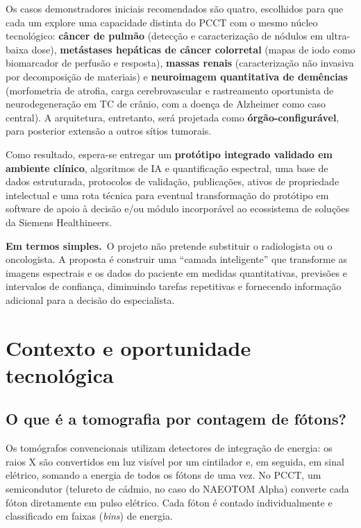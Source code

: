 \documentclass[11pt,a4paper]{article}
\newcommand{\simples}{\textcolor{titleblue}{\textbf{Em termos simples.}}\ }
\begin{document}
Os casos demonstradores iniciais recomendados são quatro, escolhidos para que cada um explore uma capacidade distinta do PCCT com o mesmo núcleo tecnológico: \textbf{câncer de pulmão} (detecção e caracterização de nódulos em ultra-baixa dose), \textbf{metástases hepáticas de câncer colorretal} (mapas de iodo como biomarcador de perfusão e resposta), \textbf{massas renais} (caracterização não invasiva por decomposição de materiais) e \textbf{neuroimagem quantitativa de demências} (morfometria de atrofia, carga cerebrovascular e rastreamento oportunista de neurodegeneração em TC de crânio, com a doença de Alzheimer como caso central). A arquitetura, entretanto, será projetada como \textbf{órgão-configurável}, para posterior extensão a outros sítios tumorais.

Como resultado, espera-se entregar um \textbf{protótipo integrado validado em ambiente clínico}, algoritmos de IA e quantificação espectral, uma base de dados estruturada, protocolos de validação, publicações, ativos de propriedade intelectual e uma rota técnica para eventual transformação do protótipo em software de apoio à decisão e/ou módulo incorporável ao ecossistema de soluções da Siemens Healthineers.

\begin{caixa}
\simples O projeto não pretende substituir o radiologista ou o oncologista. A proposta é construir uma ``camada inteligente'' que transforme as imagens espectrais e os dados do paciente em medidas quantitativas, previsões e intervalos de confiança, diminuindo tarefas repetitivas e fornecendo informação adicional para a decisão do especialista.
\end{caixa}

\section{Contexto e oportunidade tecnológica}

\subsection{O que é a tomografia por contagem de fótons?}

Os tomógrafos convencionais utilizam detectores de integração de energia: os raios X são convertidos em luz visível por um cintilador e, em seguida, em sinal elétrico, somando a energia de todos os fótons de uma vez. No PCCT, um semicondutor (telureto de cádmio, no caso do NAEOTOM Alpha) converte cada fóton diretamente em pulso elétrico. Cada fóton é contado individualmente e classificado em faixas (\emph{bins}) de energia.
\end{document}

